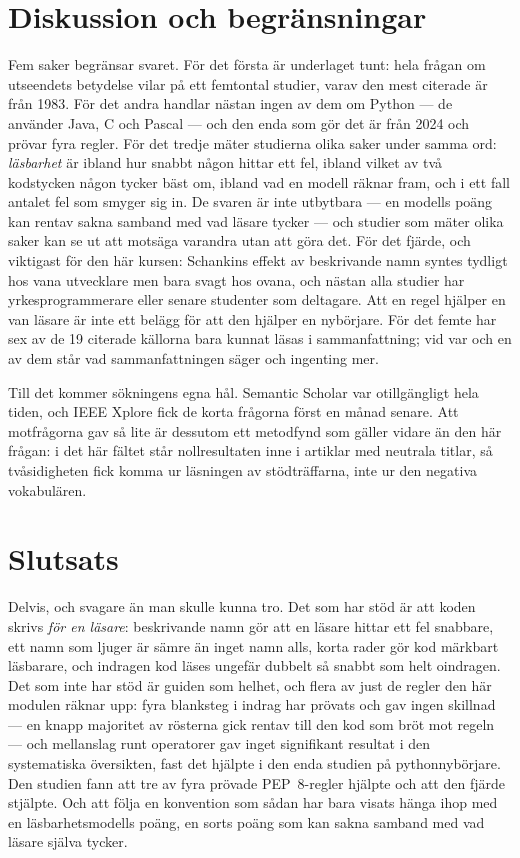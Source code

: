 \section{Diskussion och begränsningar}
\label{sec:pep8-diskussion}

Fem saker begränsar svaret.  För det första är underlaget tunt: hela
frågan om utseendets betydelse vilar på ett femtontal studier, varav den
mest citerade är från 1983.  För det andra handlar nästan ingen av dem om
Python --- de använder Java, C och Pascal --- och den enda som gör det är
från 2024 och prövar fyra regler.  För det tredje mäter studierna olika
saker under samma ord: \emph{läsbarhet} är ibland hur snabbt någon hittar
ett fel, ibland vilket av två kodstycken någon tycker bäst om, ibland vad
en modell räknar fram, och i ett fall antalet fel som smyger sig in.  De
svaren är inte utbytbara --- en modells poäng kan rentav sakna samband
med vad läsare tycker\autocite{Sergeyuk2024Readability} --- och studier som mäter olika saker kan se ut att
motsäga varandra utan att göra det.  För det fjärde, och viktigast för
den här kursen: Schankins effekt av beskrivande namn syntes tydligt hos
vana utvecklare men bara svagt hos ovana, och nästan alla studier har
yrkesprogrammerare eller senare studenter som deltagare.  Att en regel
hjälper en van läsare är inte ett belägg för att den hjälper en
nybörjare.  För det femte har sex av de 19 citerade källorna bara
kunnat läsas i sammanfattning; vid var och en av dem står vad
sammanfattningen säger och ingenting mer.

Till det kommer sökningens egna hål.  Semantic Scholar var otillgängligt
hela tiden, och IEEE Xplore fick de korta frågorna först en månad
senare.  Att motfrågorna gav
så lite
är dessutom ett metodfynd som gäller vidare än den här frågan: i det här
fältet står nollresultaten inne i artiklar med neutrala titlar, så
tvåsidigheten fick komma ur läsningen av stödträffarna, inte ur den
negativa vokabulären.

\section{Slutsats}
\label{sec:pep8-slutsats}

Delvis, och svagare än man skulle kunna tro.  Det som har stöd är att koden
skrivs \emph{för en läsare}: beskrivande namn gör att en läsare hittar
ett fel snabbare, ett namn som ljuger är sämre än inget namn alls, korta
rader gör kod märkbart läsbarare, och indragen kod läses ungefär dubbelt
så snabbt som helt oindragen.  Det som inte har stöd är guiden som
helhet, och flera av just de regler den här modulen räknar upp: fyra
blanksteg i indrag har prövats och gav ingen skillnad --- en knapp
majoritet av rösterna gick rentav till den kod som bröt mot regeln ---
och mellanslag runt
operatorer gav inget signifikant resultat i den systematiska översikten,
fast det hjälpte i den enda studien på pythonnybörjare.  Den studien fann
att tre av fyra prövade PEP~8-regler hjälpte och att den fjärde stjälpte.
Och att följa en konvention som sådan har bara visats hänga ihop med en
läsbarhetsmodells poäng, en sorts poäng som kan sakna samband med vad
läsare själva tycker.

